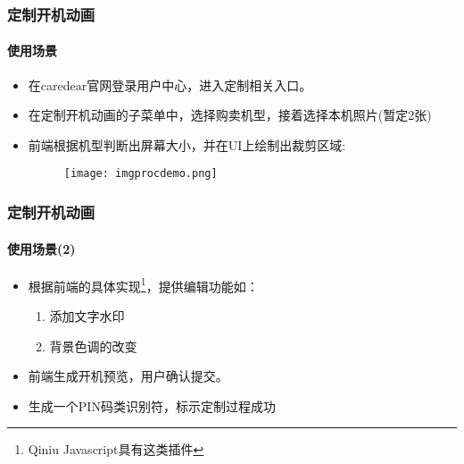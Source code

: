 \documentclass{beamer}
\begin{document}

\begin{frame}
\frametitle{定制开机动画}
  \framesubtitle{使用场景}
  
\begin{itemize}
 \item 在caredear官网登录用户中心，进入定制相关入口。
 \item 在定制开机动画的子菜单中，选择购卖机型，接着选择本机照片(暂定2张)
 \item 前端根据机型判断出屏幕大小，并在UI上绘制出裁剪区域:\begin{figure}


\texttt{[image: imgprocdemo.png]}
\end{figure}

\end{itemize}

\end{frame}

\begin{frame}
\frametitle{定制开机动画}
  \framesubtitle{使用场景(2)}
  
\begin{itemize}
 \item 根据前端的具体实现\footnote{Qiniu Javascript具有这类插件}，提供编辑功能如：
  \begin{enumerate}
    \item 添加文字水印
    \item 背景色调的改变
  \end{enumerate}
  \item 前端生成开机预览，用户确认提交。
  \item 生成一个PIN码类识别符，标示定制过程成功
\end{itemize}


\end{frame}
\end{document}
